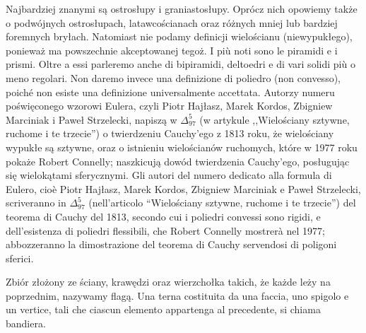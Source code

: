 Najbardziej znanymi są ostrosłupy i graniastosłupy. %
Oprócz nich opowiemy także o podwójnych ostrosłupach, latawcościanach oraz różnych mniej lub bardziej foremnych bryłach. %
Natomiast nie podamy definicji wielościanu (niewypukłego), ponieważ ma powszechnie akceptowanej tegoż. %
I più noti sono le piramidi e i prismi. %
Oltre a essi parleremo anche di bipiramidi, deltoedri e di vari solidi più o meno regolari. %
Non daremo invece una definizione di poliedro (non convesso), poiché non esiste una definizione universalmente accettata. %
Autorzy numeru poświęconego wzorowi Eulera, czyli Piotr Hajłasz, Marek Kordos, Zbigniew Marciniak i Paweł Strzelecki, napiszą w $\Delta_{97}^5$ (w artykule ,,Wielościany sztywne, ruchome i te trzecie'') o twierdzeniu Cauchy'ego z 1813 roku, że wielościany wypukłe są sztywne, oraz o istnieniu wielościanów ruchomych, które w 1977 roku pokaże Robert Connelly; naszkicują dowód twierdzenia Cauchy'ego, posługując się wielokątami sferycznymi. %
Gli autori del numero dedicato alla formula di Eulero, cioè Piotr Hajłasz, Marek Kordos, Zbigniew Marciniak e Paweł Strzelecki, scriveranno in $\Delta_{97}^5$ (nell'articolo ``Wielościany sztywne, ruchome i te trzecie'') del teorema di Cauchy del 1813, secondo cui i poliedri convessi sono rigidi, e dell'esistenza di poliedri flessibili, che Robert Connelly mostrerà nel 1977; abbozzeranno la dimostrazione del teorema di Cauchy servendosi di poligoni sferici. %

\begin{definition}
[flaga] %
[bandiera] %
    Zbiór złożony ze ściany, krawędzi oraz wierzchołka takich, że każde leży na poprzednim, nazywamy flagą. %
    Una terna costituita da una faccia, uno spigolo e un vertice, tali che ciascun elemento appartenga al precedente, si chiama bandiera. %
\end{definition} %

%